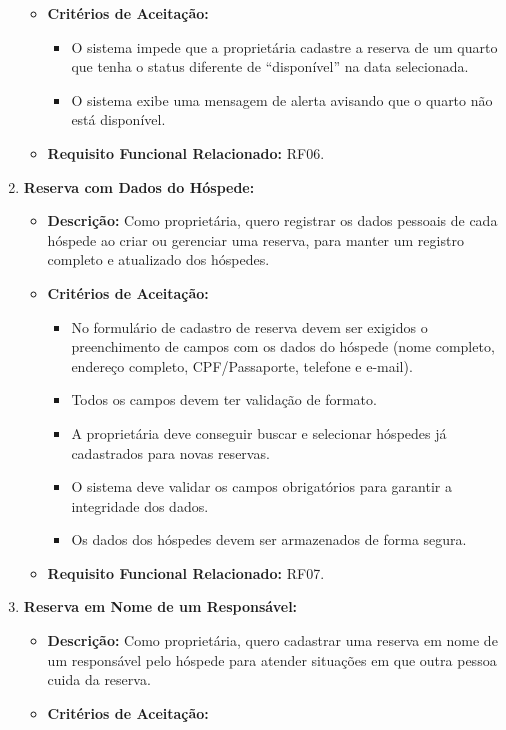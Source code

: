 \documentclass[
	12pt,				%
	openany,			%
	oneside,			%
	a4paper,			%
	english,			%
	french,				%
	spanish,			%
	brazil				%
	]{abntex2}
\begin{document}
\begin{enumerate}[label=\textbf{\arabic*.}]
\begin{itemize}
		\item \textbf{Critérios de Aceitação:}
		\begin{itemize}
			\item O sistema impede que a proprietária cadastre a reserva de um quarto que tenha o status diferente de “disponível” na data selecionada.
			\item O sistema exibe uma mensagem de alerta avisando que o quarto não está disponível.
		\end{itemize}
		\item \textbf{Requisito Funcional Relacionado:} RF06.
	\end{itemize} 
	\item \textbf{Reserva com Dados do Hóspede:}
	\begin{itemize}
		\item \textbf{Descrição:} Como proprietária, quero registrar os dados pessoais de cada hóspede ao criar ou gerenciar uma reserva, para manter um registro completo e atualizado dos hóspedes.
		\item \textbf{Critérios de Aceitação:}
		\begin{itemize}
			\item No formulário de cadastro de reserva devem ser exigidos o preenchimento de campos com os dados do hóspede (nome completo, endereço completo, CPF/Passaporte, telefone e e-mail).
			\item Todos os campos devem ter validação de formato.
			\item A proprietária deve conseguir buscar e selecionar hóspedes já cadastrados para novas reservas.
			\item O sistema deve validar os campos obrigatórios para garantir a integridade dos dados.
			\item Os dados dos hóspedes devem ser armazenados de forma segura.
		\end{itemize}
		\item \textbf{Requisito Funcional Relacionado:} RF07.
	\end{itemize} 
	\item \textbf{Reserva em Nome de um Responsável:}
	\begin{itemize}
		\item \textbf{Descrição:} Como proprietária, quero cadastrar uma reserva em nome de um responsável pelo hóspede para atender situações em que outra pessoa cuida da reserva.
		\item \textbf{Critérios de Aceitação:}
		\begin{itemize}

\end{itemize}
\end{itemize}
\end{enumerate}
\end{document}
